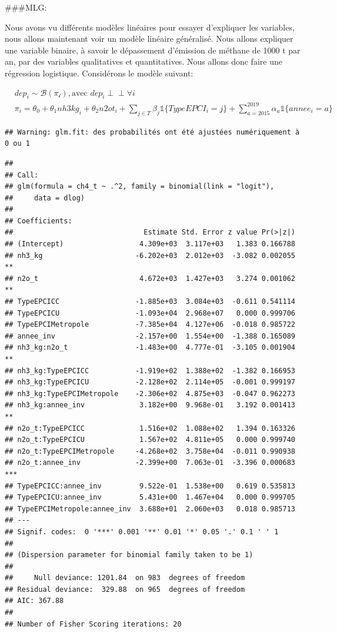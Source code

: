 \documentclass[
]{article}
\begin{document}
\#\#\#MLG:

Nous avons vu différents modèles linéaires pour essayer d'expliquer les
variables, nous allons maintenant voir un modèle linéaire généralisé.
Nous allons expliquer une variable binaire, à savoir le dépassement
d'émission de méthane de 1000 t par an, par des variables qualitatives
et quantitatives. Nous allons donc faire une régression logistique.
Considérons le modèle suivant:

\[
\begin{align*}
  & dep_i \sim \mathcal{B(\pi_i)}, \text{avec } dep_i \perp\!\!\!\perp \forall i\\
  & \pi_i = \theta_0+\theta_1 nh3kg_i + \theta_2 n2ot_i+ \sum_{j \in T} \beta_j \mathbb{1}\{TypeEPCI_i = j\} + \sum_{a=2015}^{2019} \alpha_a \mathbb{1}\{annee_i = a\}
\end{align*}
\]

\begin{verbatim}
## Warning: glm.fit: des probabilités ont été ajustées numériquement à 0 ou 1
\end{verbatim}

\begin{verbatim}
## 
## Call:
## glm(formula = ch4_t ~ .^2, family = binomial(link = "logit"), 
##     data = dlog)
## 
## Coefficients:
##                               Estimate Std. Error z value Pr(>|z|)    
## (Intercept)                  4.309e+03  3.117e+03   1.383 0.166788    
## nh3_kg                      -6.202e+03  2.012e+03  -3.082 0.002055 ** 
## n2o_t                        4.672e+03  1.427e+03   3.274 0.001062 ** 
## TypeEPCICC                  -1.885e+03  3.084e+03  -0.611 0.541114    
## TypeEPCICU                  -1.093e+04  2.968e+07   0.000 0.999706    
## TypeEPCIMetropole           -7.385e+04  4.127e+06  -0.018 0.985722    
## annee_inv                   -2.157e+00  1.554e+00  -1.388 0.165089    
## nh3_kg:n2o_t                -1.483e+00  4.777e-01  -3.105 0.001904 ** 
## nh3_kg:TypeEPCICC           -1.919e+02  1.388e+02  -1.382 0.166953    
## nh3_kg:TypeEPCICU           -2.128e+02  2.114e+05  -0.001 0.999197    
## nh3_kg:TypeEPCIMetropole    -2.306e+02  4.875e+03  -0.047 0.962273    
## nh3_kg:annee_inv             3.182e+00  9.968e-01   3.192 0.001413 ** 
## n2o_t:TypeEPCICC             1.516e+02  1.088e+02   1.394 0.163326    
## n2o_t:TypeEPCICU             1.567e+02  4.811e+05   0.000 0.999740    
## n2o_t:TypeEPCIMetropole     -4.268e+02  3.758e+04  -0.011 0.990938    
## n2o_t:annee_inv             -2.399e+00  7.063e-01  -3.396 0.000683 ***
## TypeEPCICC:annee_inv         9.522e-01  1.538e+00   0.619 0.535813    
## TypeEPCICU:annee_inv         5.431e+00  1.467e+04   0.000 0.999705    
## TypeEPCIMetropole:annee_inv  3.688e+01  2.060e+03   0.018 0.985713    
## ---
## Signif. codes:  0 '***' 0.001 '**' 0.01 '*' 0.05 '.' 0.1 ' ' 1
## 
## (Dispersion parameter for binomial family taken to be 1)
## 
##     Null deviance: 1201.84  on 983  degrees of freedom
## Residual deviance:  329.88  on 965  degrees of freedom
## AIC: 367.88
## 
## Number of Fisher Scoring iterations: 20
\end{verbatim}
\end{document}

